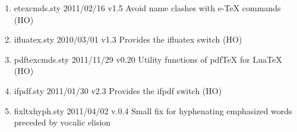 \begin{enumerate}
\item etexcmds.sty 2011/02/16 v1.5 Avoid name clashes with e-TeX commands (HO)
\item ifluatex.sty 2010/03/01 v1.3 Provides the ifluatex switch (HO)
\item pdftexcmds.sty 2011/11/29 v0.20 Utility functions of pdfTeX for LuaTeX (HO)
\item ifpdf.sty 2011/01/30 v2.3 Provides the ifpdf switch (HO)
\item fixltxhyph.sty 2011/04/02 v.0.4 Small fix for hyphenating emphasized words preceded by vocalic elision
\end{enumerate}
